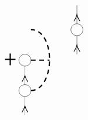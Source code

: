 \begin{equation}
\begin{tikzpicture}[x=0.75pt,y=0.75pt,yscale=-1,xscale=1]
\draw   (335.75,98.08) .. controls (335.75,92.74) and (340.12,88.4) .. (345.5,88.4) .. controls (350.88,88.4) and (355.25,92.74) .. (355.25,98.08) .. controls (355.25,103.43) and (350.88,107.77) .. (345.5,107.77) .. controls (340.12,107.77) and (335.75,103.43) .. (335.75,98.08) -- cycle ;
\draw    (345.5,138.08) -- (345.5,107.77) ;
\draw [shift={(345.5,122.93)}, rotate = 450] [color={rgb, 255:red, 0; green, 0; blue, 0 }  ][line width=0.75]    (10.93,-4.9) .. controls (6.95,-2.3) and (3.31,-0.67) .. (0,0) .. controls (3.31,0.67) and (6.95,2.3) .. (10.93,4.9)   ;
\draw   (335.75,147.77) .. controls (335.75,142.42) and (340.12,138.08) .. (345.5,138.08) .. controls (350.88,138.08) and (355.25,142.42) .. (355.25,147.77) .. controls (355.25,153.12) and (350.88,157.45) .. (345.5,157.45) .. controls (340.12,157.45) and (335.75,153.12) .. (335.75,147.77) -- cycle ;
\draw    (345.5,187.77) -- (345.5,157.45) ;
\draw [shift={(345.5,172.61)}, rotate = 450] [color={rgb, 255:red, 0; green, 0; blue, 0 }  ][line width=0.75]    (10.93,-4.9) .. controls (6.95,-2.3) and (3.31,-0.67) .. (0,0) .. controls (3.31,0.67) and (6.95,2.3) .. (10.93,4.9)   ;
\draw [line width=1.5]  [dash pattern={on 5.63pt off 4.5pt}]  (355.25,147.77) .. controls (395.25,146.4) and (395.25,47.4) .. (355.25,48.4) ;
\draw [line width=1.5]  [dash pattern={on 5.63pt off 4.5pt}]  (355.25,98.08) -- (385.25,98.08) ;
\draw [line width=1.5]    (313.25,96.8) -- (330.25,96.8) ;
\draw [line width=1.5]    (321.75,106.4) -- (321.75,87.21) ;

\draw    (429.5,38.72) -- (429.5,8.4) ;
\draw [shift={(429.5,23.56)}, rotate = 450] [color={rgb, 255:red, 0; green, 0; blue, 0 }  ][line width=0.75]    (10.93,-4.9) .. controls (6.95,-2.3) and (3.31,-0.67) .. (0,0) .. controls (3.31,0.67) and (6.95,2.3) .. (10.93,4.9)   ;
\draw   (419.75,48.4) .. controls (419.75,43.05) and (424.12,38.72) .. (429.5,38.72) .. controls (434.88,38.72) and (439.25,43.05) .. (439.25,48.4) .. controls (439.25,53.75) and (434.88,58.08) .. (429.5,58.08) .. controls (424.12,58.08) and (419.75,53.75) .. (419.75,48.4) -- cycle ;
\draw    (429.5,88.4) -- (429.5,58.08) ;
\draw [shift={(429.5,73.24)}, rotate = 450] [color={rgb, 255:red, 0; green, 0; blue, 0 }  ][line width=0.75]    (10.93,-4.9) .. controls (6.95,-2.3) and (3.31,-0.67) .. (0,0) .. controls (3.31,0.67) and (6.95,2.3) .. (10.93,4.9)   ;


\end{tikzpicture}
\end{equation}
